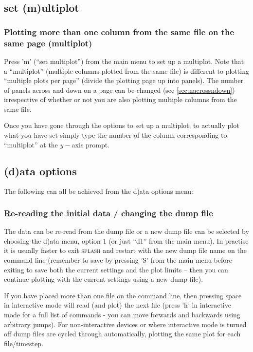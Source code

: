 \documentclass[a4paper,10pt]{article}
\newcommand{\splash}{\textsc{splash }}
\begin{document}
\subsection{set (m)ultiplot}
\label{sec:multiplot}
\subsubsection{ Plotting more than one column from the same file on the same page (multiplot)}
 Press 'm'  (``set multiplot'') from the main menu to set up a multiplot. Note that a ``multiplot'' (multiple columns plotted from the same file) is different to plotting ``multiple plots per page'' (divide the plotting page up into panels). The number of panels across and down on a page can be changed (see \ref{sec:nacrossndown}) irrespective of whether or not you are also plotting multiple columns from the same file.

Once you have gone through the options to set up a multiplot, to actually plot what you have set simply type the number of the column corresponding to ``multiplot'' at the $y-$axis prompt.

\subsection{(d)ata options}
The following can all be achieved from the d)ata options menu:

\subsubsection{ Re-reading the initial data / changing the dump file}
\label{sec:d1}
 The data can be re-read from the dump file or a new dump file can be selected by choosing  the d)ata menu, option 1 (or just ``d1'' from the main menu). In practise it is usually faster to exit \splash and restart with the new dump file name on the command line (remember to save by pressing 'S' from the main menu before exiting to save both the current settings and the plot limits -- then you can continue plotting with the current settings using a new dump file).
 
 If you have placed more than one file on the command line, then pressing space in interactive mode will read (and plot) the next file (press 'h' in interactive mode for a full list of commands - you can move forwards and backwards using arbitrary jumps). For non-interactive devices or where interactive mode is turned off dump files are cycled through automatically, plotting the same plot for each file/timestep.
 
\end{document}
